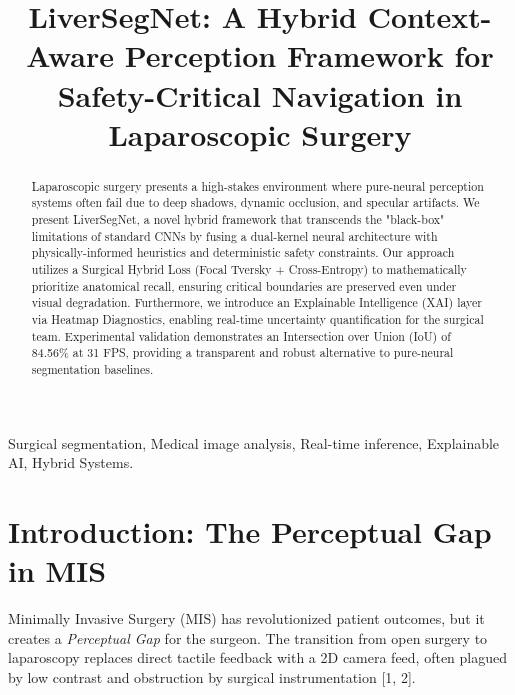 \documentclass[conference]{IEEEtran}
\begin{document}
\title{LiverSegNet: A Hybrid Context-Aware Perception Framework for Safety-Critical Navigation in Laparoscopic Surgery}

\author{
}

\maketitle

\begin{abstract}
Laparoscopic surgery presents a high-stakes environment where pure-neural perception systems often fail due to deep shadows, dynamic occlusion, and specular artifacts. We present LiverSegNet, a novel hybrid framework that transcends the "black-box" limitations of standard CNNs by fusing a dual-kernel neural architecture with physically-informed heuristics and deterministic safety constraints. Our approach utilizes a Surgical Hybrid Loss (Focal Tversky + Cross-Entropy) to mathematically prioritize anatomical recall, ensuring critical boundaries are preserved even under visual degradation. Furthermore, we introduce an Explainable Intelligence (XAI) layer via Heatmap Diagnostics, enabling real-time uncertainty quantification for the surgical team. Experimental validation demonstrates an Intersection over Union (IoU) of 84.56\% at 31 FPS, providing a transparent and robust alternative to pure-neural segmentation baselines.
\end{abstract}

\begin{IEEEkeywords}
Surgical segmentation, Medical image analysis, Real-time inference, Explainable AI, Hybrid Systems.
\end{IEEEkeywords}

\section{Introduction: The Perceptual Gap in MIS}
Minimally Invasive Surgery (MIS) has revolutionized patient outcomes, but it creates a \textit{Perceptual Gap} for the surgeon. The transition from open surgery to laparoscopy replaces direct tactile feedback with a 2D camera feed, often plagued by low contrast and obstruction by surgical instrumentation [1, 2]. 
\end{document}
